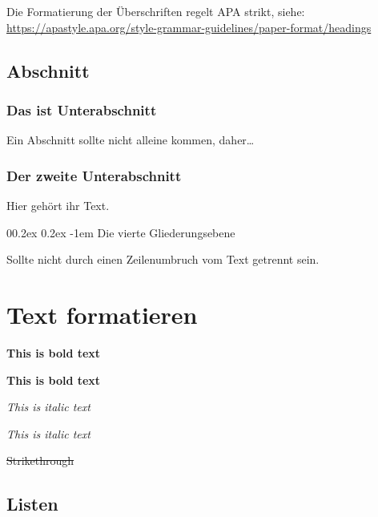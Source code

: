 \documentclass[
  doc,floatsintext]{apa7}
\makeatletter
\let\oldparagraph\paragraph
\renewcommand{\paragraph}[1]{\oldparagraph{#1}\mbox{}}
\renewcommand{\paragraph}{\@startsection{paragraph}{4}{\parindent}%
  {0\baselineskip \@plus 0.2ex \@minus 0.2ex}%
  {-1em}%
  {\normalfont\normalsize\bfseries\itshape\typesectitle}}
\renewcommand{\paragraph}{\@startsection{paragraph}{4}{\parindent}%
  {0\baselineskip \@plus 0.2ex \@minus 0.2ex}%
  {-1em}%
  {\normalfont\normalsize\bfseries\typesectitle}}
\makeatother
\begin{document}
Die Formatierung der Überschriften regelt APA strikt, siehe:
\url{https://apastyle.apa.org/style-grammar-guidelines/paper-format/headings}

\hypertarget{abschnitt}{%
\subsection{Abschnitt}\label{abschnitt}}

\hypertarget{das-ist-unterabschnitt}{%
\subsubsection{Das ist Unterabschnitt}\label{das-ist-unterabschnitt}}

Ein Abschnitt sollte nicht alleine kommen, daher\ldots{}

\hypertarget{der-zweite-unterabschnitt}{%
\subsubsection{Der zweite Unterabschnitt}\label{der-zweite-unterabschnitt}}

Hier gehört ihr Text.

\hypertarget{die-vierte-gliederungsebene}{%
\paragraph{Die vierte Gliederungsebene}\label{die-vierte-gliederungsebene}}

Sollte nicht durch einen Zeilenumbruch vom Text getrennt sein.

\hypertarget{text-formatieren}{%
\section{Text formatieren}\label{text-formatieren}}

\textbf{This is bold text}

\textbf{This is bold text}

\emph{This is italic text}

\emph{This is italic text}

\st{Strikethrough}

\hypertarget{listen}{%
\subsection{Listen}\label{listen}}
\end{document}
